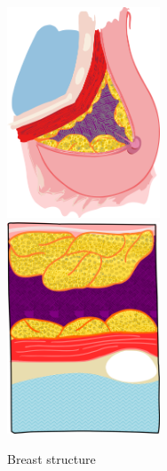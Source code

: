 \begin{figure}
    \centering
    \begin{subfigure}[b]{0.28\textwidth}
        \centering
        \includegraphics[width=0.5\textwidth]{breast}
        \includegraphics[width=0.5\textwidth]{slice}
        \caption{{\small Breast structure}}    
        \label{fig:features:breast}
    \end{subfigure}
    \hfill
    \begin{subfigure}[b]{0.4\textwidth}   
        \centering 

\end{subfigure}
\end{figure}
